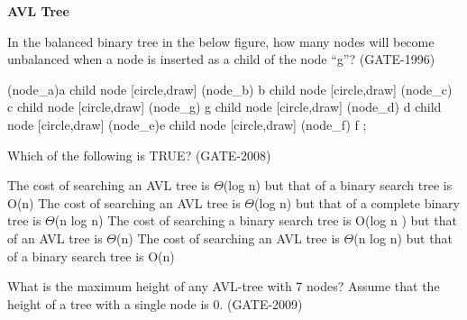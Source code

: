 
\centerline{\textbf{ \LARGE AVL Tree}}

\begin{questyle}
  \question  In the balanced binary tree in the below figure, how many nodes will become unbalanced when a
             node is inserted as a child of the node “g”?  (GATE-1996)

        \begin{myTree}
         (node_a){a}
            child
            {
                node [circle,draw] (node_b) {b}
                child
                {
                    node [circle,draw] (node_c) {c}
                    child { node [circle,draw] (node_g) {g} }
                }
                child
                {
                    node [circle,draw] (node_d) {d}
                }
            }
            child
            {
                node [circle,draw] (node_e){e}
                child
                {
                    node [circle,draw] (node_f) {f}
                }
            };
        \end{myTree}


  \begin{choices}
  \end{choices}
\end{questyle}

\begin{questyle}
  \question  Which of the following is TRUE?  (GATE-2008)

  \begin{choices}
    \CorrectChoice  The cost of searching an AVL tree is \(\Theta\)(log n) but that of a binary search tree is O(n)
    \choice         The cost of searching an AVL tree is \(\Theta\)(log n) but that of a complete binary tree is \(\Theta\)(n log n)
    \choice         The cost of searching a binary search tree is O(log n ) but that of an AVL tree is \(\Theta\)(n)
    \choice         The cost of searching an AVL tree is \(\Theta\)(n log n) but that of a binary search tree is O(n)
  \end{choices}
\end{questyle}

\begin{questyle}
  \question  What is the maximum height of any AVL-tree with 7 nodes? Assume that the height of a tree
             with a single node is 0.  (GATE-2009)

  \begin{choices}
  \end{choices}
\end{questyle}

